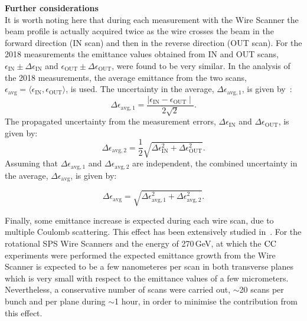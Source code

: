 \textbf{Further considerations}\\
It is worth noting here that during each measurement with the Wire Scanner the beam profile is actually acquired twice as the wire crosses the beam in the forward direction (IN scan) and then in the reverse direction (OUT scan). For the 2018 measurements the emittance values obtained from IN and OUT scans, $\epsilon_\mathrm{IN} \pm \Delta \epsilon_\mathrm{IN}$ and $\epsilon_\mathrm{OUT} \pm \Delta \epsilon_\mathrm{OUT}$, were found to be very similar. In the analysis of the 2018 measurements, the average emittance from the two scans, $\epsilon_\mathrm{avg} = \langle \epsilon_\mathrm{IN}, \epsilon_\mathrm{OUT}\rangle$, is used. The uncertainty in the average, $\Delta \epsilon_\mathrm{avg, 1}$, is given by~\cite{uncertainty_in_the_mean}: 
\begin{equation}\label{eq:uncertainty_mean_ws}
   \Delta \epsilon_\mathrm{avg, 1} = \frac{\mid \epsilon_\mathrm{IN} - \epsilon_\mathrm{OUT} \mid}{2 \sqrt{2}}.
\end{equation}
The propagated uncertainty from the measurement errors, $\Delta \epsilon_\mathrm{IN}$ and $\Delta \epsilon_\mathrm{OUT}$, is given by:
\begin{equation}\label{eq:propagated_uncertainty_ws}
   \Delta \epsilon_\mathrm{avg, 2} = \frac{1}{2}\sqrt{ \Delta \epsilon_\mathrm{IN}^2 + \Delta \epsilon_\mathrm{OUT}^2}.
\end{equation}
Assuming that $\Delta \epsilon_\mathrm{avg, 1}$ and $\Delta \epsilon_\mathrm{avg, 2}$ are independent, the combined uncertainty in the average, $\Delta \epsilon_\mathrm{avg}$, is given by:

\begin{equation}\label{eq:combined_uncertainty_ws}
   \Delta \epsilon_\mathrm{avg} = \sqrt{\Delta \epsilon_\mathrm{avg, 1} ^2 + \Delta \epsilon_\mathrm{avg, 2} ^2}.
\end{equation}

Finally, some emittance increase is expected during each wire scan, due to multiple Coulomb scattering. This effect has been extensively studied in~\cite{Roncarolo:1481835}. For the rotational SPS Wire Scanners and the energy of 270\,GeV, at which the ${\mathrm{CC}}$ experiments were performed the expected emittance growth from the Wire Scanner is expected to be a few nanometeres per scan in both transverse planes~\cite{Roncarolo:1481835} which is very small with respect to the emittance values of a few micrometers. Nevertheless, a conservative number of scans were carried out, $\sim$20 scans per bunch and per plane during $\sim$1 hour, in order to minimise the contribution from this effect.


